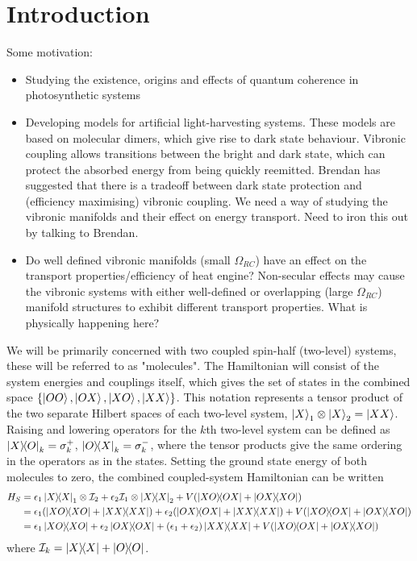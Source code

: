 \documentclass[]{article}
\begin{document}
\section{Introduction}
Some motivation:
\begin{itemize}
	\item Studying the existence, origins and effects of quantum coherence in photosynthetic systems
	\item Developing models for artificial light-harvesting systems. These models are based on molecular dimers, which give rise to dark state behaviour. Vibronic coupling allows transitions between the bright and dark state, which can protect the absorbed energy from being quickly reemitted. Brendan has suggested that there is a tradeoff between dark state protection and (efficiency maximising) vibronic coupling. We need a way of studying the vibronic manifolds and their effect on energy transport. Need to iron this out by talking to Brendan.
	\item Do well defined vibronic manifolds (small $\Omega_{RC}$) have an effect on the transport properties/efficiency of heat engine? Non-secular effects may cause the vibronic systems with either well-defined or overlapping (large $\Omega_{RC}$) manifold structures to exhibit different transport properties. What is physically happening here?
\end{itemize}
We will be primarily concerned with two coupled spin-half (two-level) systems, these will be referred to as "molecules". The Hamiltonian will consist of the system energies and couplings itself, which gives the set of states in the combined space $\{\ket{OO},\ket{OX}, \ket{XO}, \ket{XX}\}$. This notation represents a tensor product of the two separate Hilbert spaces of each two-level system, $\ket{X}_1\otimes\ket{X}_2 = \ket{XX}$. Raising and lowering operators for the $k$th two-level system can be defined as $\dyad{X}{O}_k = \sigma_k^+$, $\dyad{O}{X}_k = \sigma_k^-$, where the tensor products give the same ordering in the operators as in the states. Setting the ground state energy of both molecules  to zero, the combined coupled-system Hamiltonian can be written
\begin{align}
H_S &=  \epsilon_1\dyad{X}{X}_1\otimes \mathcal{I}_2 +  \epsilon_2\mathcal{I}_1 \otimes\dyad{X}{X}_2 + V(\dyad{XO}{OX} + \dyad{OX}{XO}) \\
&=\epsilon_1(\dyad{XO}{XO} + \dyad{XX}{XX}) +  \epsilon_2(\dyad{OX}{OX} + \dyad{XX}{XX}) + V(\dyad{XO}{OX} + \dyad{OX}{XO})\\
&=\epsilon_1\dyad{XO}  +  \epsilon_2\dyad{OX} + (\epsilon_1 + \epsilon_2) \dyad{XX} + V(\dyad{XO}{OX} + \dyad{OX}{XO})
\end{align}
where $\mathcal{I}_k = \dyad{X}{X}+\dyad{O}{O}$.
\end{document}

